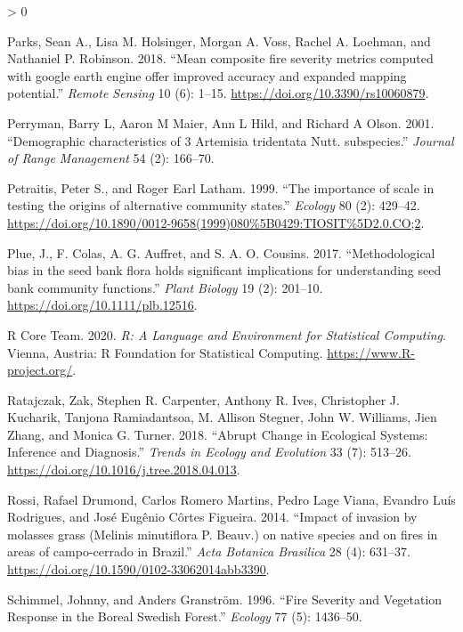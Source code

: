 \documentclass[
  12pt,
]{article}
\newlength{\cslhangindent}
\newenvironment{CSLReferences}[2] %
 {%
  \setlength{\parindent}{0pt}
  \ifodd #1 \everypar{\setlength{\hangindent}{\cslhangindent}}\ignorespaces\fi
  \ifnum #2 > 0
  \setlength{\parskip}{#2\baselineskip}
  \fi
 }%
 {}
\begin{document}
\begin{CSLReferences}{1}{0}
\leavevmode\hypertarget{ref-Parks2018}{}%
Parks, Sean A., Lisa M. Holsinger, Morgan A. Voss, Rachel A. Loehman,
and Nathaniel P. Robinson. 2018. {``{Mean composite fire severity
metrics computed with google earth engine offer improved accuracy and
expanded mapping potential}.''} \emph{Remote Sensing} 10 (6): 1--15.
\url{https://doi.org/10.3390/rs10060879}.

\leavevmode\hypertarget{ref-Perryman2001}{}%
Perryman, Barry L, Aaron M Maier, Ann L Hild, and Richard A Olson. 2001.
{``{Demographic characteristics of 3 Artemisia tridentata Nutt.
subspecies}.''} \emph{Journal of Range Management} 54 (2): 166--70.

\leavevmode\hypertarget{ref-Petraitis1999}{}%
Petraitis, Peter S., and Roger Earl Latham. 1999. {``{The importance of
scale in testing the origins of alternative community states}.''}
\emph{Ecology} 80 (2): 429--42.
\url{https://doi.org/10.1890/0012-9658(1999)080\%5B0429:TIOSIT\%5D2.0.CO;2}.

\leavevmode\hypertarget{ref-Plue2017}{}%
Plue, J., F. Colas, A. G. Auffret, and S. A. O. Cousins. 2017.
{``{Methodological bias in the seed bank flora holds significant
implications for understanding seed bank community functions}.''}
\emph{Plant Biology} 19 (2): 201--10.
\url{https://doi.org/10.1111/plb.12516}.

\leavevmode\hypertarget{ref-R}{}%
R Core Team. 2020. \emph{R: A Language and Environment for Statistical
Computing}. Vienna, Austria: R Foundation for Statistical Computing.
\url{https://www.R-project.org/}.

\leavevmode\hypertarget{ref-Ratajczak2018}{}%
Ratajczak, Zak, Stephen R. Carpenter, Anthony R. Ives, Christopher J.
Kucharik, Tanjona Ramiadantsoa, M. Allison Stegner, John W. Williams,
Jien Zhang, and Monica G. Turner. 2018. {``{Abrupt Change in Ecological
Systems: Inference and Diagnosis}.''} \emph{Trends in Ecology and
Evolution} 33 (7): 513--26.
\url{https://doi.org/10.1016/j.tree.2018.04.013}.

\leavevmode\hypertarget{ref-Rossi2014}{}%
Rossi, Rafael Drumond, Carlos Romero Martins, Pedro Lage Viana, Evandro
Luís Rodrigues, and José Eugênio Côrtes Figueira. 2014. {``{Impact of
invasion by molasses grass (Melinis minutiflora P. Beauv.) on native
species and on fires in areas of campo-cerrado in Brazil}.''} \emph{Acta
Botanica Brasilica} 28 (4): 631--37.
\url{https://doi.org/10.1590/0102-33062014abb3390}.

\leavevmode\hypertarget{ref-Schimmel1996}{}%
Schimmel, Johnny, and Anders Granström. 1996. {``{Fire Severity and
Vegetation Response in the Boreal Swedish Forest}.''} \emph{Ecology} 77
(5): 1436--50.


\end{CSLReferences}
\end{document}
